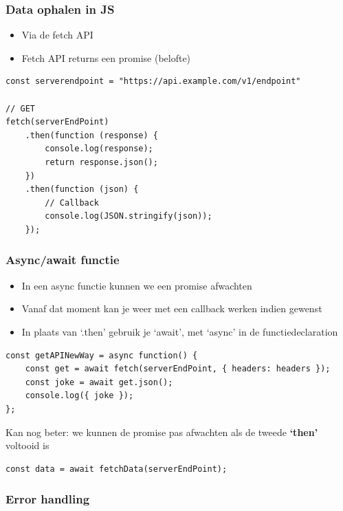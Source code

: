 \documentclass{article}
\newcommand{\bold}[1]{\textbf{#1}}
\begin{document}
\subsubsection{Data ophalen in JS}
\begin{itemize}
    \item Via de fetch API
    \item Fetch API returns een promise (belofte)
\end{itemize}

\begin{verbatim}
const serverendpoint = "https://api.example.com/v1/endpoint"

// GET
fetch(serverEndPoint)
    .then(function (response) {
        console.log(response);
        return response.json();
    })
    .then(function (json) {
        // Callback
        console.log(JSON.stringify(json));
    });
\end{verbatim}

\subsubsection{Async/await functie}

\begin{itemize}
    \item In een async functie kunnen we een promise afwachten
    \item Vanaf dat moment kan je weer met een callback werken indien gewenst
    \item In plaats van `.then' gebruik je `await', met `async' in de functiedeclaration
\end{itemize}

\begin{verbatim}
const getAPINewWay = async function() {
    const get = await fetch(serverEndPoint, { headers: headers });
    const joke = await get.json();
    console.log({ joke });
};
\end{verbatim}

Kan nog beter: we kunnen de promise pas afwachten als de tweede \bold{`then'} voltooid is

\begin{verbatim}
const data = await fetchData(serverEndPoint);
\end{verbatim}

\subsubsection{Error handling}
\end{document}
